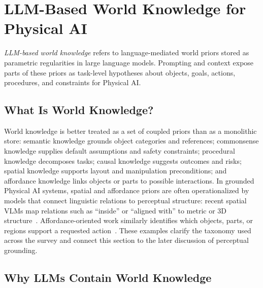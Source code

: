 \section{LLM-Based World Knowledge for Physical AI}
\label{sec:world-knowledge}

\emph{LLM-based world knowledge} refers to language-mediated world priors stored as parametric regularities in large language models. 
Prompting and context expose parts of these priors as task-level hypotheses about objects, goals, actions, procedures, and constraints for Physical AI. 

\subsection{What Is World Knowledge?}

World knowledge is better treated as a set of coupled priors than as a monolithic store: semantic knowledge grounds object categories and references; commonsense knowledge supplies default assumptions and safety constraints; procedural knowledge decomposes tasks; causal knowledge suggests outcomes and risks; spatial knowledge supports layout and manipulation preconditions; and affordance knowledge links objects or parts to possible interactions. 
In grounded Physical AI systems, spatial and affordance priors are often operationalized by models that connect linguistic relations to perceptual structure: recent spatial VLMs map relations such as ``inside'' or ``aligned with'' to metric or 3D structure~\citep{chen2024spatialvlm,yuan2024robopoint,song2025robospatial}. 
Affordance-oriented work similarly identifies which objects, parts, or regions support a requested action~\citep{qian2024affordancellm,huang2024manipvqa,chu2025threedaffordancellm}. 
These examples clarify the taxonomy used across the survey and connect this section to the later discussion of perceptual grounding.

\subsection{Why LLMs Contain World Knowledge}


